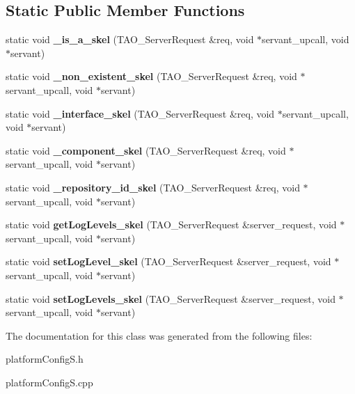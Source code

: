 \subsection*{Static Public Member Functions}
\begin{DoxyCompactItemize}
\item 
static void {\bfseries \+\_\+is\+\_\+a\+\_\+skel} (T\+A\+O\+\_\+\+Server\+Request \&req, void $\ast$servant\+\_\+upcall, void $\ast$servant)\label{classPOA__platformConfig_1_1platformConfig__I_a2a645be111b2e9f09c0f72093d3e387b}

\item 
static void {\bfseries \+\_\+non\+\_\+existent\+\_\+skel} (T\+A\+O\+\_\+\+Server\+Request \&req, void $\ast$servant\+\_\+upcall, void $\ast$servant)\label{classPOA__platformConfig_1_1platformConfig__I_af2dee8863a939886b6ec5f2234a086b8}

\item 
static void {\bfseries \+\_\+interface\+\_\+skel} (T\+A\+O\+\_\+\+Server\+Request \&req, void $\ast$servant\+\_\+upcall, void $\ast$servant)\label{classPOA__platformConfig_1_1platformConfig__I_a2d26631da33b5f0f93fca92befd54e84}

\item 
static void {\bfseries \+\_\+component\+\_\+skel} (T\+A\+O\+\_\+\+Server\+Request \&req, void $\ast$servant\+\_\+upcall, void $\ast$servant)\label{classPOA__platformConfig_1_1platformConfig__I_ac44f9715f9ac660851e29476c58ad95a}

\item 
static void {\bfseries \+\_\+repository\+\_\+id\+\_\+skel} (T\+A\+O\+\_\+\+Server\+Request \&req, void $\ast$servant\+\_\+upcall, void $\ast$servant)\label{classPOA__platformConfig_1_1platformConfig__I_ad36d7b1979d237a3f58f21276050f09d}

\item 
static void {\bfseries get\+Log\+Levels\+\_\+skel} (T\+A\+O\+\_\+\+Server\+Request \&server\+\_\+request, void $\ast$servant\+\_\+upcall, void $\ast$servant)\label{classPOA__platformConfig_1_1platformConfig__I_a450180c733680a2f59ddaa58d2b8cf63}

\item 
static void {\bfseries set\+Log\+Level\+\_\+skel} (T\+A\+O\+\_\+\+Server\+Request \&server\+\_\+request, void $\ast$servant\+\_\+upcall, void $\ast$servant)\label{classPOA__platformConfig_1_1platformConfig__I_adf5a00c25cd64cd1c6acf718dd2db13a}

\item 
static void {\bfseries set\+Log\+Levels\+\_\+skel} (T\+A\+O\+\_\+\+Server\+Request \&server\+\_\+request, void $\ast$servant\+\_\+upcall, void $\ast$servant)\label{classPOA__platformConfig_1_1platformConfig__I_a9e2133c1798439ce8e645ae0e4ded1de}

\end{DoxyCompactItemize}


The documentation for this class was generated from the following files\+:\begin{DoxyCompactItemize}
\item 
platform\+Config\+S.\+h\item 
platform\+Config\+S.\+cpp\end{DoxyCompactItemize}
